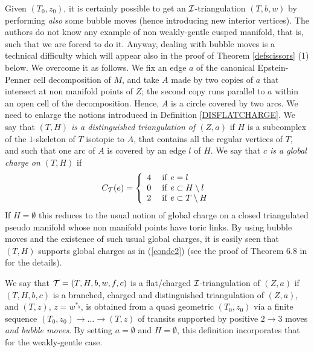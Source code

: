 Given $(T_0,z_0)$, it is certainly possible to get an
${\mathcal I}$-triangulation $(T,b,w)$ by performing {\it also} some bubble
moves (hence introducing new interior vertices). The authors do not
know any example of non weakly-gentle cusped manifold, that is, such
that we are forced to do it. Anyway, dealing with bubble moves is a technical
difficulty which will appear also in the proof of Theorem
\ref{defscissors} (1) below. We overcome it as follows. We fix an edge
$a$ of the canonical Epstein-Penner cell decomposition of $M$, and
take $A$ made by two copies of $a$ that intersect at non manifold
points of $Z$; the second copy runs parallel to $a$ within an open
cell of the decomposition.  Hence, $A$ is a circle covered by two
arcs.  We need to enlarge the notions introduced in Definition
\ref{DISFLATCHARGE}. We say that {\it $(T,H)$ is a distinguished
  triangulation of $(Z,a)$} if $H$ is a subcomplex of the $1$-skeleton
of $T$ isotopic to $A$, that contains all the regular vertices of $T$,
and such that one arc of $A$ is covered by an edge $l$ of $H$. We say
that {\it $c$ is a global charge on $(T,H)$} if
\begin{equation}\label{condc2}C_{{\mathcal T}}(e)=\left
\lbrace\begin{array}{l} 4\\0\\ 2\end{array}\right.\begin{array}{l}
{\rm if}\ e=l\\{\rm if}\ e \subset H\setminus l\\ {\rm if}\ e \subset
T \setminus H \end{array}
\end{equation}
If $H=\emptyset$ this reduces to the usual notion of global charge on
a closed triangulated pseudo manifold whose non manifold points have
toric links. By using bubble moves and the existence of such usual
global charges, it is easily seen that $(T,H)$ supports global charges
as in (\ref{condc2}) (see the proof of Theorem 6.8 in \cite{BB2} for
the details).

We say that ${\mathcal T}=(T,H,b,w,f,c)$ is a flat/charged ${\mathcal I}$-triangulation
of $(Z,a)$ if $(T,H,b,c)$ is a branched, charged and distinguished
triangulation of $(Z,a)$, and $(T,z)$, $z=w^{*_b}$, is obtained from a
quasi geometric $(T_0,z_0)$ via a finite sequence $(T_0,z_0)
\rightarrow \ldots \rightarrow (T,z)$ of transits supported by
positive $2 \rightarrow 3$ moves {\it and bubble moves}. By setting $a
= \emptyset$ and $H=\emptyset$, this definition incorporates that for
the weakly-gentle case.
\smallskip

